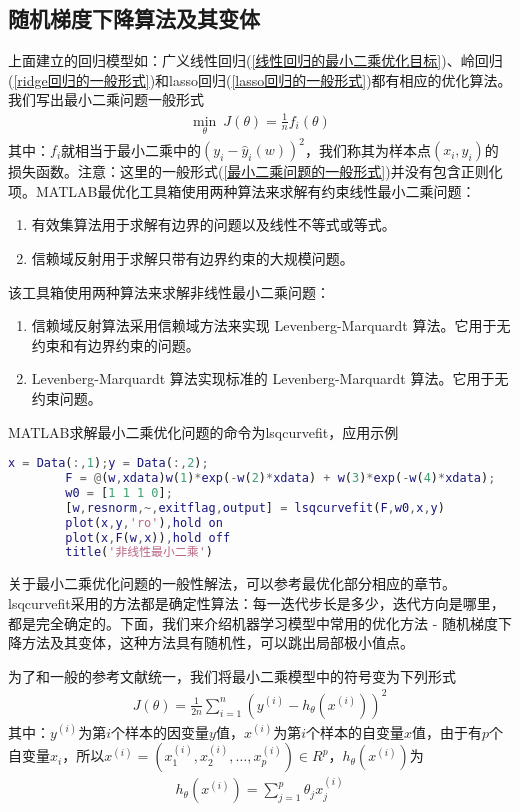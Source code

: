     \subsection{随机梯度下降算法及其变体}
        \par
        上面建立的回归模型如：广义线性回归(\ref{线性回归的最小二乘优化目标})、岭回归(\ref{ridge回归的一般形式})和lasso回归(\ref{lasso回归的一般形式})都有相应的优化算法。我们写出最小二乘问题一般形式
        \begin{align}
        \label{最小二乘问题的一般形式}
        \min_\theta \ J(\theta) = \frac 1n f_i(\theta)
        \end{align}
        其中：$f_i$就相当于最小二乘中的$(y_i - \hat{y}_i(w))^2$，我们称其为样本点$(x_i,y_i)$的损失函数。注意：这里的一般形式(\ref{最小二乘问题的一般形式})并没有包含正则化项。MATLAB最优化工具箱使用两种算法来求解有约束线性最小二乘问题：
        \begin{enumerate}
        \item 有效集算法用于求解有边界的问题以及线性不等式或等式。
        \item 信赖域反射用于求解只带有边界约束的大规模问题。
        \end{enumerate}
        该工具箱使用两种算法来求解非线性最小二乘问题：
        \begin{enumerate}
        \item 信赖域反射算法采用信赖域方法来实现 Levenberg-Marquardt 算法。它用于无约束和有边界约束的问题。
        \item Levenberg-Marquardt 算法实现标准的 Levenberg-Marquardt 算法。它用于无约束问题。
        \end{enumerate}
        MATLAB求解最小二乘优化问题的命令为lsqcurvefit，应用示例
        \begin{lstlisting}[language = Matlab]
        x = Data(:,1);y = Data(:,2);
        F = @(w,xdata)w(1)*exp(-w(2)*xdata) + w(3)*exp(-w(4)*xdata);
        w0 = [1 1 1 0];
        [w,resnorm,~,exitflag,output] = lsqcurvefit(F,w0,x,y)
        plot(x,y,'ro'),hold on
        plot(x,F(w,x)),hold off
        title('非线性最小二乘')
        \end{lstlisting}
        关于最小二乘优化问题的一般性解法，可以参考最优化部分相应的章节。lsqcurvefit采用的方法都是确定性算法：每一迭代步长是多少，迭代方向是哪里，都是完全确定的。下面，我们来介绍机器学习模型中常用的优化方法 - 随机梯度下降方法及其变体，这种方法具有随机性，可以跳出局部极小值点。
        \par
        为了和一般的参考文献统一，我们将最小二乘模型中的符号变为下列形式
        \begin{align*}
        J(\theta) = \frac{1}{2n}\sum_{i=1}^n \left(y^{(i)}  -  h_\theta \left( x^{(i)} \right) \right) ^2
        \end{align*}
        其中：$y^{(i)}$为第$i$个样本的因变量$y$值，$x^{(i)}$为第$i$个样本的自变量$x$值，由于有$p$个自变量$x_i$，所以$x^{(i)} = (x_1^{(i)},x_2^{(i)},\dots,x_p^{(i)}) \in R^p$，$h_\theta \left( x^{(i)} \right) $为
        \begin{align*}
        h_\theta \left( x^{(i)} \right)  = \sum_{j = 1}^p\theta_j x_j^{(i)}
        \end{align*}
